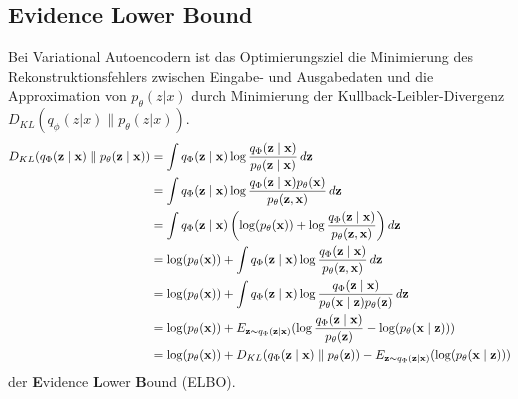 \subsection{Evidence Lower Bound}

\label{elbo}
Bei Variational Autoencodern ist das Optimierungsziel die Minimierung des Rekonstruktionsfehlers zwischen Eingabe- und Ausgabedaten und die Approximation von $p_\theta (z|x)$ durch Minimierung der Kullback-Leibler-Divergenz $D_{KL}(q_\phi (z|x) \parallel p_\theta (z|x) )$.
\begin{align*}
    \small
    D_{KL}(q_\Phi(\mathbf{z\mid x})\parallel p_\theta(\mathbf{z\mid x})) &= \int q_\Phi(\mathbf{z\mid x}) \log \frac{q_\Phi(\mathbf{z\mid x})}{p_\theta(\mathbf{z\mid x})} \, d\mathbf{z}\\
    &= \int q_\Phi(\mathbf{z\mid x}) \log \frac{q_\Phi(\mathbf{z\mid x})p_\theta(\mathbf{x})}{p_\theta(\mathbf{z,x})} \,d\mathbf{z}\\
    &= \int q_\Phi(\mathbf{z\mid x}) \left( \log (p_\theta(\mathbf{x})) + \log \frac{q_\Phi(\mathbf{z\mid x})}{p_\theta(\mathbf{z,x})}\right) d\mathbf{z}\\
    &= \log (p_\theta(\mathbf{x})) + \int q_\Phi(\mathbf{z\mid x}) \log \frac{q_\Phi(\mathbf{z\mid x})}{p_\theta(\mathbf{z,x})} \,d\mathbf{z}\\
    &= \log (p_\theta(\mathbf{x})) + \int q_\Phi(\mathbf{z\mid x}) \log \frac{q_\Phi(\mathbf{z\mid x})}{p_\theta(\mathbf{x\mid z})p_\theta(\mathbf{z})} \,d\mathbf{z}\\
    &= \log (p_\theta(\mathbf{x})) + E_{\mathbf{z} \sim q_\Phi(\mathbf{z\mid x})}(\log \frac{q_\Phi(\mathbf{z\mid x})}{p_\theta(\mathbf{z})} - \log(p_\theta(\mathbf{x\mid z})))\\
    &= \log (p_\theta(\mathbf{x})) + D_{KL}(q_\Phi(\mathbf{z\mid x}) \parallel p_\theta(\mathbf{z})) - E_{\mathbf{z} \sim q_\Phi(\mathbf{z\mid x})}(\log(p_\theta(\mathbf{x\mid z})))
    \end{align*}
der \textbf{E}vidence \textbf{L}ower \textbf{B}ound (ELBO).


